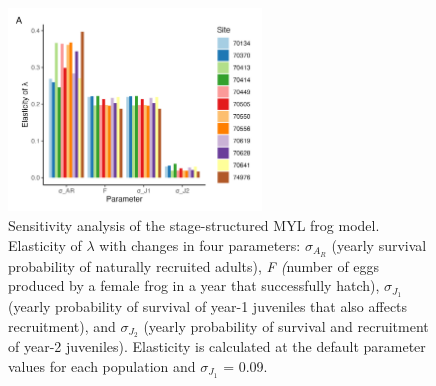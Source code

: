 \documentclass[9pt,twoside,lineno]{pnas-new}
\begin{document}
\begin{figure}

{\centering \includegraphics[width=0.60\textwidth]{figures/pop_viability_figures_for_supp.jpg}

}

\caption{\label{fig-viability-supp}Sensitivity analysis of the
stage-structured MYL frog model. Elasticity of \(\lambda\) with changes
in four parameters: \(\sigma_{A_R}\) (yearly survival probability of
naturally recruited adults), \emph{F (}number of eggs produced by a
female frog in a year that successfully hatch), \(\sigma_{J_1}\) (yearly
probability of survival of year-1 juveniles that also affects
recruitment), and \(\sigma_{J_2}\) (yearly probability of survival and
recruitment of year-2 juveniles). Elasticity is calculated at the
default parameter values for each population and \(\sigma_{J_1}\) =
0.09.}

\end{figure}\clearpage

\newpage
\end{document}
